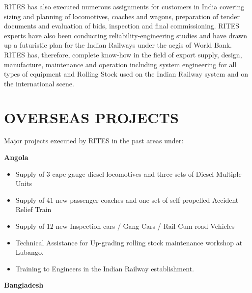 \bigskip

{\color[rgb]{0.0,0.0,0.039215688}
RITES has also executed numerous assignments for customers in India covering sizing and planning of locomotives, coaches
and wagons, preparation of tender documents and evaluation of bids, inspection and final commissioning. RITES experts
have also been conducting reliability-engineering studies and have drawn up a futuristic plan for the Indian Railways
under the aegis of World Bank. RITES has, therefore, complete know-how in the field of export supply, design,
manufacture, maintenance and operation including system engineering for all types of equipment and Rolling Stock used
on the Indian Railway system and on the international scene. }


\bigskip


\section{OVERSEAS PROJECTS}

\bigskip

{\color[rgb]{0.0,0.0,0.039215688}
Major projects executed by RITES in the past areas under:}


\bigskip

{\color[rgb]{0.0,0.0,0.039215688}
\textbf{Angola}}


\bigskip

\begin{itemize}
\item {\color[rgb]{0.0,0.0,0.039215688}
Supply of 3 cape gauge diesel locomotives and three sets of Diesel Multiple Units}
\item {\color[rgb]{0.0,0.0,0.039215688}
Supply of 41 new passenger coaches and one set of self-propelled Accident Relief Train}
\item {\color[rgb]{0.0,0.0,0.039215688}
Supply of 12 new Inspection cars / Gang Cars / Rail Cum road Vehicles}
\item {\color[rgb]{0.0,0.0,0.039215688}
Technical Assistance for Up-grading rolling stock maintenance workshop at Lubango.}
\item {\color[rgb]{0.0,0.0,0.039215688}
Training to Engineers in the Indian Railway establishment.}
\end{itemize}

\bigskip

{\color[rgb]{0.0,0.0,0.039215688}
\textbf{Bangladesh}}


\bigskip


